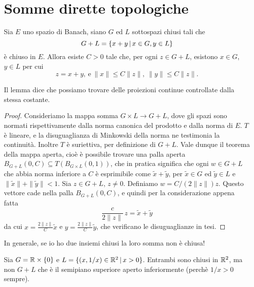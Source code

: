 \section{Somme dirette topologiche}
\begin{lemma}
	Sia $E$ uno spazio di Banach, siano $G$ ed $L$ sottospazi chiusi tali che
	\begin{equation*}
		G+L = \{ x + y \,|\, x \in G, y \in L\}
	\end{equation*}
	è chiuso in $E$.
	Allora esiste $C > 0$ tale che, per ogni $z \in G+L$, esistono $x \in G$, $y \in L$ per cui
	\begin{equation*}
		z = x+y, \ \text{e}\ \|x\| \leq C\|z\|, \ \|y\| \leq C\|z\|.
	\end{equation*}
\end{lemma}
\begin{remark}
	Il lemma dice che possiamo trovare delle proiezioni continue controllate dalla stessa costante.
\end{remark}
\begin{proof}
	Consideriamo la mappa somma $G \times L \to G+L$, dove gli spazi sono normati rispettivamente dalla norma canonica del prodotto e dalla norma di $E$.
	$T$ è lineare, e la disuguaglianza di Minkowski della norma ne testimonia la continuità. Inoltre $T$ è suriettiva, per definizione di $G+L$.
	Vale dunque il teorema della mappa aperta, cioè è possibile trovare una palla aperta $B_{G+L}(0, C) \subseteq T(B_{G \times L}(0, 1))$, che in pratica significa che ogni $w \in G+L$ che abbia norma inferiore a $C$ è esprimibile come $\tilde x + \tilde y$, per $\tilde x \in G$ ed $\tilde y \in L$ e $\|\tilde x\|+\|\tilde y\|<1$.
	Sia $z \in G+L$, $z \neq 0$. Definiamo $w=C/(2\|z\|) z$. Questo vettore cade nella palla $B_{G+L}(0, C)$, e quindi per la considerazione appena fatta
	\begin{equation*}
		\frac{c}{2 \|z\|}\, z = \tilde x + \tilde y
	\end{equation*}
	da cui $x = \frac{2\|z\|}C \tilde x$ e $y= \frac{2\|z\|}C \tilde y$, che verificano le disuguaglianze in tesi.
\end{proof}

In generale, se io ho due insiemi chiusi la loro somma non è chiusa!

\begin{counterexample}
	Sia $G = \mathbb{R} \times \{0\}$ e $L = \{(x,1/x) \in \mathbb{R}^2 \,|\, x >0\}$. Entrambi sono chiusi in $\mathbb{R}^2$, ma non $G+L$ che è il semipiano superiore aperto inferiormente (perchè $1/x > 0$ sempre).
\end{counterexample}

